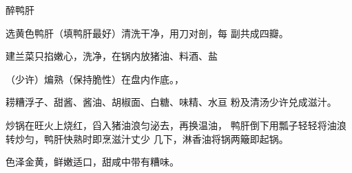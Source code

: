 \begin{recipe}{醉鸭肝}

\ingredients


\cooking

\step 选黄色鸭肝（填鸭肝最好）清洗干净，用刀对剖，每 副共成四瓣。

\step 建兰菜只掐嫩心，洗净，在锅内放猪油、料酒、盐

（少许）煸熟（保持脆性）在盘内作底。，

\step 耢糟浮子、甜酱、酱油、胡椒面、白糖、味精、水亘 粉及清汤少许兑成滋汁。

\step 炒锅在旺火上烧红，舀入猪油浪匀泌去，再换温油， 鸭肝倒下用瓢子轻轻将油浪转炒匀，鸭肝快熟时即烹滋汁丈少 几下，淋香油将锅两簸即起锅。

\notes

色泽金黄，鲜嫩适口，甜咸中带有糟味。

\end{recipe}

